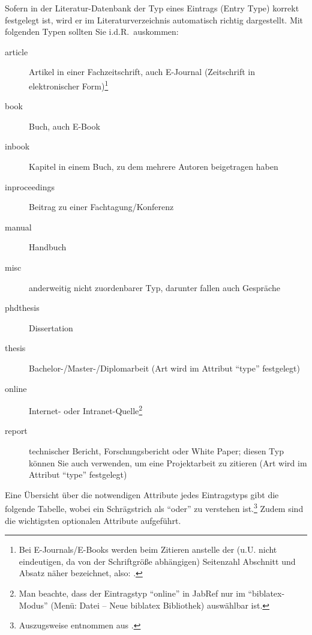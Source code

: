 Sofern in der Literatur-Datenbank der Typ eines Eintrags (Entry Type) korrekt festgelegt ist, wird er im Literaturverzeichnis automatisch richtig dargestellt. Mit folgenden Typen sollten Sie i.d.R.\ auskommen:
\begin{description}
\item[article] Artikel in einer Fachzeitschrift, auch E-Journal (Zeitschrift in elektronischer Form)\footnote{Bei E-Journals/E-Books werden beim Zitieren anstelle der (u.U. nicht eindeutigen, da von der Schriftgröße abhängigen) Seitenzahl Abschnitt und Absatz näher bezeichnet, also: \cite[Abschnitt 1.2.3, Absatz 4]{Staab}.}
\item[book] Buch, auch E-Book 
\item[inbook] Kapitel in einem Buch, zu dem mehrere Autoren beigetragen haben 
\item[inproceedings] Beitrag zu einer Fachtagung/Konferenz 
\item[manual] Handbuch
\item[misc] anderweitig nicht zuordenbarer Typ, darunter fallen auch Gespräche
\item[phdthesis] Dissertation
\item[thesis] Bachelor-/Master-/Diplomarbeit (Art wird im Attribut \enquote{type} festgelegt) 
\item[online] Internet- oder Intranet-Quelle\footnote{\label{fn:onlineEntryType}Man beachte, dass der Eintragstyp \enquote{online} in JabRef nur im \enquote{biblatex-Modus} (Menü: Datei -- Neue biblatex Bibliothek) auswählbar ist.}
\item[report] technischer Bericht, Forschungsbericht oder White Paper; diesen Typ können Sie auch verwenden, um eine Projektarbeit zu zitieren (Art wird im Attribut \enquote{type} festgelegt) 
\end{description} 

Eine Übersicht über die notwendigen Attribute jedes Eintragstyps gibt die folgende Tabelle, wobei ein Schrägstrich als \enquote{oder} zu verstehen ist.\footnote{Auszugsweise entnommen aus \cite{biblatex:manual}.} Zudem sind die wichtigsten optionalen Attribute aufgeführt.

